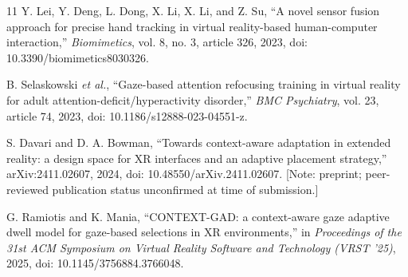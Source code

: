 \documentclass[conference]{IEEEtran}
\begin{document}
\begin{thebibliography}{11}
Y. Lei, Y. Deng, L. Dong, X. Li, X. Li, and Z. Su, ``A novel sensor fusion approach for precise hand tracking in virtual reality-based human-computer interaction,'' \emph{Biomimetics}, vol. 8, no. 3, article 326, 2023, doi: 10.3390/biomimetics8030326.

B. Selaskowski \emph{et al.}, ``Gaze-based attention refocusing training in virtual reality for adult attention-deficit/hyperactivity disorder,'' \emph{BMC Psychiatry}, vol. 23, article 74, 2023, doi: 10.1186/s12888-023-04551-z.

S. Davari and D. A. Bowman, ``Towards context-aware adaptation in extended reality: a design space for XR interfaces and an adaptive placement strategy,'' arXiv:2411.02607, 2024, doi: 10.48550/arXiv.2411.02607.
[Note: preprint; peer-reviewed publication status unconfirmed at time of submission.]

G. Ramiotis and K. Mania, ``CONTEXT-GAD: a context-aware gaze adaptive dwell model for gaze-based selections in XR environments,'' in \emph{Proceedings of the 31st ACM Symposium on Virtual Reality Software and Technology (VRST '25)}, 2025, doi: 10.1145/3756884.3766048.

\end{thebibliography}
\end{document}
